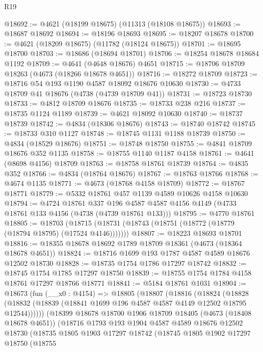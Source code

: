 \begin{lexlean}{R19}
\begin{coremodule}
@18692 := @4621 (@18199 @18675) (@11313 (@18108 @18675))
@18693 := @18687 @18692
@18694 := @18196 @18693
@18695 := @18207 @18678
@18700 := @4621 (@18209 @18675) (@11782 (@18124 @18675))
@18701 := @18695 @18700
@18703 := @18686 (@18694 @18701)
@18706 := @18254 @18678 @18684 @1192
@18709 := @4641 (@4648 @18676) @4651
@18715 := @18706 @18709 @18263 (@4673 (@18266 @18678 @4651))
@18716 := @18272 @18709
@18723 := @18716 @54 @193 @1190 @4587 @18092 @18676 @10630
@18730 := @4733 @18709 @41 @18676 (@4738 (@4739 @18709 @41))
@18731 := @18723 @18730
@18733 := @4812 @18709 @18676
@18735 := @18733 @238 @216
@18737 := @18735 @1124 @1189
@18739 := @4621 @18092 @10630
@18740 := @18737 @18739
@18742 := @4834 (@18306 @18676)
@18743 := @18740 @18742
@18745 := @18733 @310 @1127
@18748 := @18745 @1131 @1188 @18739
@18750 := @4834 (@18529 @18676)
@18751 := @18748 @18750
@18755 := @4841 @18709 @18676 @352 @1135
@18758 := @18755 @1140 @1187 @4158
@18761 := @4641 (@8698 @4156) @18709
@18763 := @18758 @18761 @18739
@18764 := @4835 @352
@18766 := @4834 (@18764 @18676)
@18767 := @18763 @18766
@18768 := @4674 @1135
@18771 := @4673 (@18768 @4158 @18709)
@18772 := @18767 @18771
@18779 := @5332 @18761 @457 @1139 @4589 @10626 @4158 @10630
@18794 := @4724
    @18761
    @337
    @196
    @4587
    @4587
    @4156
    @4149
    (@4733 @18761 @133 @4156 (@4738 (@4739 @18761 @133)))
@18795 := @4770 @18761
@18805 := @18703
    (@18715 (@18731 (@18743 (@18751 (@18772 (@18779 (@18794 @18795) (@17524 @4146)))))))
@18807 := @18223 @18693 @18701
@18816 := @18355 @18678 @18692 @1789 @18709 @18361 (@4673 (@18364 @18678 @4651))
@18824 := @18716 @1699 @193 @1787 @4587 @4589 @18676 @12502 @18730
@18828 := @18735 @1754 @1786 @17297 @18742
@18832 := @18745 @1754 @1785 @17297 @18750
@18839 := @18755 @1754 @1784 @4158 @18761 @17297 @18766 @18771
@18841 := @5184 @18761 @1031
@18904 := @18673
    (fun (__x0 : @4154) =>
    @18805
      (@18807
        (@18816
          (@18824
            (@18828 (@18832 (@18839 (@18841 @1699 @196 @4587 @4587 @4149 @12502 @18795 @12544))))))
        (@18399
          @18678
          @18700
          @1906
          @18709
          @18405
          (@4673 (@18408 @18678 @4651))
          (@18716
            @1793
            @193
            @1904
            @4587
            @4589
            @18676
            @12502
            @18730
            (@18735
              @1805
              @1903
              @17297
              @18742
              (@18745
                @1805
                @1902
                @17297
                @18750
                (@18755

\end{coremodule}
\end{lexlean}
